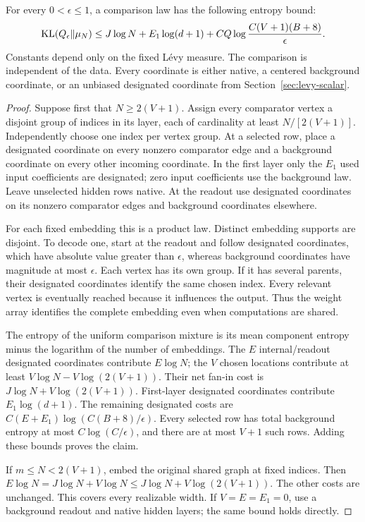 \begin{lemma}
\label{lem:dag-entropy}
For every $0<\epsilon\le1$, a comparison law has the following entropy bound:
\[
 \operatorname{KL}(Q_\epsilon\|\mu_N)
 \le J\log N+E_1\log(d+1)
       +C Q\log\frac{C(V+1)(B+8)}\epsilon.
\]
Constants depend only on the fixed L\'evy measure. The comparison is independent of the data. Every coordinate is either native, a centered background coordinate, or an unbiased designated coordinate from Section~\ref{sec:levy-scalar}.
\end{lemma}
\begin{proof}
Suppose first that $N\ge2(V+1)$. Assign every comparator vertex a disjoint group of indices in its layer, each of cardinality at least $N/[2(V+1)]$. Independently choose one index per vertex group. At a selected row, place a designated coordinate on every nonzero comparator edge and a background coordinate on every other incoming coordinate. In the first layer only the $E_1$ used input coefficients are designated; zero input coefficients use the background law. Leave unselected hidden rows native. At the readout use designated coordinates on its nonzero comparator edges and background coordinates elsewhere.

For each fixed embedding this is a product law. Distinct embedding supports are disjoint. To decode one, start at the readout and follow designated coordinates, which have absolute value greater than $\epsilon$, whereas background coordinates have magnitude at most $\epsilon$. Each vertex has its own group. If it has several parents, their designated coordinates identify the same chosen index. Every relevant vertex is eventually reached because it influences the output. Thus the weight array identifies the complete embedding even when computations are shared.

The entropy of the uniform comparison mixture is its mean component entropy minus the logarithm of the number of embeddings. The $E$ internal/readout designated coordinates contribute $E\log N$; the $V$ chosen locations contribute at least $V\log N-V\log(2(V+1))$. Their net fan-in cost is $J\log N+V\log(2(V+1))$. First-layer designated coordinates contribute $E_1\log(d+1)$. The remaining designated costs are $C(E+E_1)\log(C(B+8)/\epsilon)$. Every selected row has total background entropy at most $C\log(C/\epsilon)$, and there are at most $V+1$ such rows. Adding these bounds proves the claim.

If $m\le N<2(V+1)$, embed the original shared graph at fixed indices. Then
$E\log N=J\log N+V\log N\le J\log N+V\log(2(V+1))$.
The other costs are unchanged. This covers every realizable width. If $V=E=E_1=0$, use a background readout and native hidden layers; the same bound holds directly.
\end{proof}


